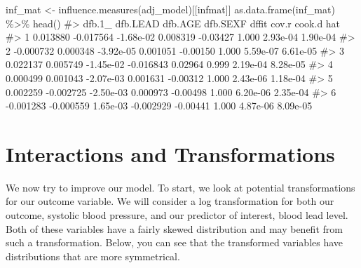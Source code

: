 \documentclass[
  letterpaper,
]{krantz}
\makeatletter
\newenvironment{Shaded}{\begin{snugshade}}{\end{snugshade}}
\newcommand{\CommentTok}[1]{\textcolor[rgb]{0.37,0.37,0.37}{#1}}
\newcommand{\FunctionTok}[1]{\textcolor[rgb]{0.28,0.35,0.67}{#1}}
\newcommand{\NormalTok}[1]{\textcolor[rgb]{0.00,0.23,0.31}{#1}}
\newcommand{\OtherTok}[1]{\textcolor[rgb]{0.00,0.23,0.31}{#1}}
\newcommand{\SpecialCharTok}[1]{\textcolor[rgb]{0.37,0.37,0.37}{#1}}
\newcommand{\StringTok}[1]{\textcolor[rgb]{0.13,0.47,0.30}{#1}}
\newenvironment{kframe}{%
\medskip{}
\setlength{\fboxsep}{.8em}
 \def\at@end@of@kframe{}%
 \ifinner\ifhmode%
  \def\at@end@of@kframe{\end{minipage}}%
  \begin{minipage}{\columnwidth}%
 \fi\fi%
 \def\FrameCommand##1{\hskip\@totalleftmargin \hskip-\fboxsep
 \colorbox{shadecolor}{##1}\hskip-\fboxsep
     \hskip-\linewidth \hskip-\@totalleftmargin \hskip\columnwidth}%
 \MakeFramed {\advance\hsize-\width
   \@totalleftmargin\z@ \linewidth\hsize
   \@setminipage}}%
 {\par\unskip\endMakeFramed%
 \at@end@of@kframe}
\renewenvironment{Shaded}{\begin{kframe}}{\end{kframe}}
\makeatother
\begin{document}
\begin{Shaded}
\begin{Highlighting}[]
\NormalTok{inf\_mat }\OtherTok{\textless{}{-}} \FunctionTok{influence.measures}\NormalTok{(adj\_model)[[}\StringTok{\textquotesingle{}infmat\textquotesingle{}}\NormalTok{]]}
\FunctionTok{as.data.frame}\NormalTok{(inf\_mat) }\SpecialCharTok{\%\textgreater{}\%} \FunctionTok{head}\NormalTok{()}
\CommentTok{\#\textgreater{}      dfb.1\_  dfb.LEAD   dfb.AGE  dfb.SEXF    dffit cov.r   cook.d      hat}
\CommentTok{\#\textgreater{} 1  0.013880 {-}0.017564 {-}1.68e{-}02  0.008319 {-}0.03427 1.000 2.93e{-}04 1.90e{-}04}
\CommentTok{\#\textgreater{} 2 {-}0.000732  0.000348 {-}3.92e{-}05  0.001051 {-}0.00150 1.000 5.59e{-}07 6.61e{-}05}
\CommentTok{\#\textgreater{} 3  0.022137  0.005749 {-}1.45e{-}02 {-}0.016843  0.02964 0.999 2.19e{-}04 8.28e{-}05}
\CommentTok{\#\textgreater{} 4  0.000499  0.001043 {-}2.07e{-}03  0.001631 {-}0.00312 1.000 2.43e{-}06 1.18e{-}04}
\CommentTok{\#\textgreater{} 5  0.002259 {-}0.002725 {-}2.50e{-}03  0.000973 {-}0.00498 1.000 6.20e{-}06 2.35e{-}04}
\CommentTok{\#\textgreater{} 6 {-}0.001283 {-}0.000559  1.65e{-}03 {-}0.002929 {-}0.00441 1.000 4.87e{-}06 8.09e{-}05}
\end{Highlighting}
\end{Shaded}

\hypertarget{interactions-and-transformations}{%
\section{Interactions and
Transformations}\label{interactions-and-transformations}}

We now try to improve our model. To start, we look at potential
transformations for our outcome variable. We will consider a log
transformation for both our outcome, systolic blood pressure, and our
predictor of interest, blood lead level. Both of these variables have a
fairly skewed distribution and may benefit from such a transformation.
Below, you can see that the transformed variables have distributions
that are more symmetrical.
\end{document}

